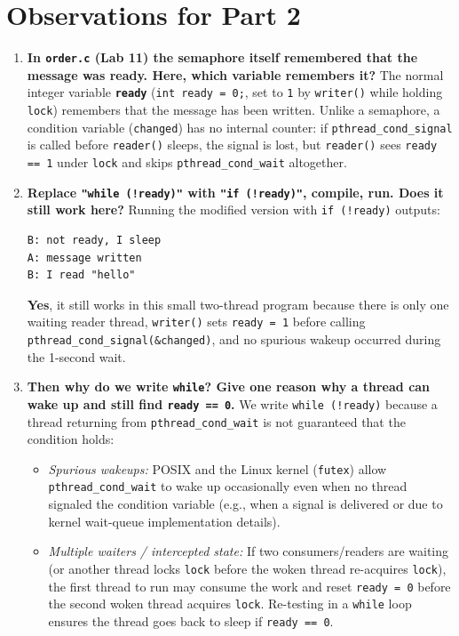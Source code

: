 \documentclass{../latex/utmreport}
\providecommand{\tightlist}{\setlength{\itemsep}{0pt}\setlength{\parskip}{0pt}}
\begin{document}
\section{Observations for Part 2}

\begin{enumerate}
\tightlist
\item \textbf{In \texttt{order.c} (Lab 11) the semaphore itself remembered that the message was ready. Here, which variable remembers it?}
The normal integer variable \textbf{\texttt{ready}} (\texttt{int ready = 0;}, set to \texttt{1} by \texttt{writer()} while holding \texttt{lock}) remembers that the message has been written. Unlike a semaphore, a condition variable (\texttt{changed}) has no internal counter: if \texttt{pthread\_cond\_signal} is called before \texttt{reader()} sleeps, the signal is lost, but \texttt{reader()} sees \texttt{ready == 1} under \texttt{lock} and skips \texttt{pthread\_cond\_wait} altogether.

\item \textbf{Replace \texttt{"while (!ready)"} with \texttt{"if (!ready)"}, compile, run. Does it still work here?}
Running the modified version with \texttt{if (!ready)} outputs:
\begin{lstlisting}
B: not ready, I sleep
A: message written
B: I read "hello"
\end{lstlisting}
\textbf{Yes}, it still works in this small two-thread program because there is only one waiting reader thread, \texttt{writer()} sets \texttt{ready = 1} before calling \texttt{pthread\_cond\_signal(\&changed)}, and no spurious wakeup occurred during the 1-second wait.

\item \textbf{Then why do we write \texttt{while}? Give one reason why a thread can wake up and still find \texttt{ready == 0}.}
We write \texttt{while (!ready)} because a thread returning from \texttt{pthread\_cond\_wait} is not guaranteed that the condition holds:
\begin{itemize}
\tightlist
\item \emph{Spurious wakeups:} POSIX and the Linux kernel (\texttt{futex}) allow \texttt{pthread\_cond\_wait} to wake up occasionally even when no thread signaled the condition variable (e.g., when a signal is delivered or due to kernel wait-queue implementation details).
\item \emph{Multiple waiters / intercepted state:} If two consumers/readers are waiting (or another thread locks \texttt{lock} before the woken thread re-acquires \texttt{lock}), the first thread to run may consume the work and reset \texttt{ready = 0} before the second woken thread acquires \texttt{lock}. Re-testing in a \texttt{while} loop ensures the thread goes back to sleep if \texttt{ready == 0}.
\end{itemize}
\end{enumerate}
\end{document}
